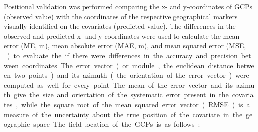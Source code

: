 

Positional validation was performed comparing the x- and y-coordinates of GCPs (observed value) with the 
coordinates of the respective geographical markers visually identified on the covariates (predicted value). 
The differences in the observed and predicted x- and y-coordinates were used to calculate the mean error (ME, 
\si{\m}), mean absolute error (MAE, \si{\m}), and mean squared error (MSE, \si{\m\square}) to evaluate the  if 
there were differences in the accuracy and precision between coordinates. The error vector (or module, the 
euclidean distance between two points) and its azimuth (the orientation of the error vector) were computed as 
well for every point. The mean of the error vector and its azimuth give the size and orientation of the 
systematic error present in the covariates, while the square root of the mean squared error vector (RMSE) is a 
measure of the uncertainty about the true position of the covariate in the geographic space.

The field location of the GCPs is as follows:

